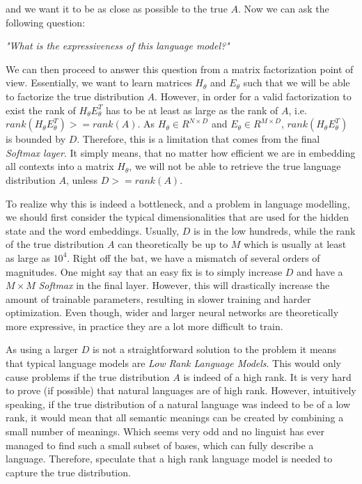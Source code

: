 and we want it to be as close as possible to the true $ A $. Now we can ask the following question:

\begin{center}
    \emph{"What is the expressiveness of this language model?"}
\end{center}


We can then proceed to answer this question from a matrix factorization point of view. Essentially, we want to learn matrices $ H_\theta $ and $ E_\theta $ such that we will be able to factorize the true distribution $ A $. However, in order for a valid factorization to exist the rank of $ H_\theta E^T_\theta $ has to be at least as large as the rank of $ A $, i.e. $ rank(H_\theta E^T_\theta ) >= rank(A) $. As $ H_\theta \in R^{N \times D} $ and $ E_\theta \in R^{M \times D} $, $ rank(H_\theta E^T_\theta ) $ is bounded by $ D $. Therefore, this is a limitation that comes from the final \emph{Softmax layer}. It simply means, that no matter how efficient we are in embedding all contexts into a matrix $ H_\theta $, we will not be able to retrieve the true language distribution $ A $, unless $ D >= rank(A) $.

To realize why this is indeed a bottleneck, and a problem in language modelling, we should first consider the typical dimensionalities that are used for the hidden state and the word embeddings. Usually, $ D $ is in the low hundreds, while the rank of the true distribution $ A $ can theoretically be up to $ M $ which is usually at least as large as $ 10^4 $. Right off the bat, we have a mismatch of several orders of magnitudes. One might say that an easy fix is to simply increase $ D $ and have a $ M \times M $ \emph{Softmax} in the final layer. However, this will drastically increase the amount of trainable parameters, resulting in slower training and harder optimization. Even though, wider and larger neural networks are theoretically more expressive, in practice they are a lot more difficult to train.

As using a larger $ D $ is not a straightforward solution to the problem it means that typical language models are \emph{Low Rank Language Models}. This would only cause problems if the true distribution $ A $ is indeed of a high rank. It is very hard to prove (if possible) that natural languages are of high rank. However, intuitively speaking, if the true distribution of a natural language was indeed to be of a low rank, it would mean that all semantic meanings can be created by combining a small number of meanings. Which seems very odd and no linguist has ever managed to find such a small subset of bases, which can fully describe a language. Therefore, \citet{yang2017breaking} speculate that a high rank language model is needed to capture the true distribution.

